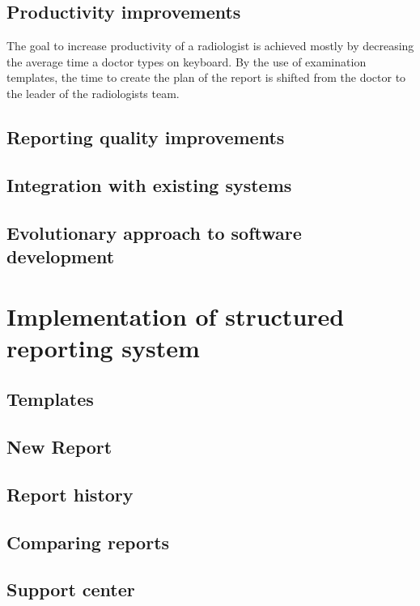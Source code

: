 \documentclass[12pt, twoside, openany]{report}
\theoremstyle{definition}
\begin{document}
\section{Productivity improvements}
The goal to increase productivity of a radiologist is achieved mostly by decreasing the average time a doctor types on keyboard. By the use of examination templates, the time to create the plan of the report is shifted from the doctor to the leader of the radiologists team. 


\section{Reporting quality improvements}

\section{Integration with existing systems}

\section{Evolutionary approach to software development}







\chapter{Implementation of structured reporting system}
\section{Templates}
\section{New Report}
\section{Report history}
\section{Comparing reports}
\section{Support center}
\end{document}
